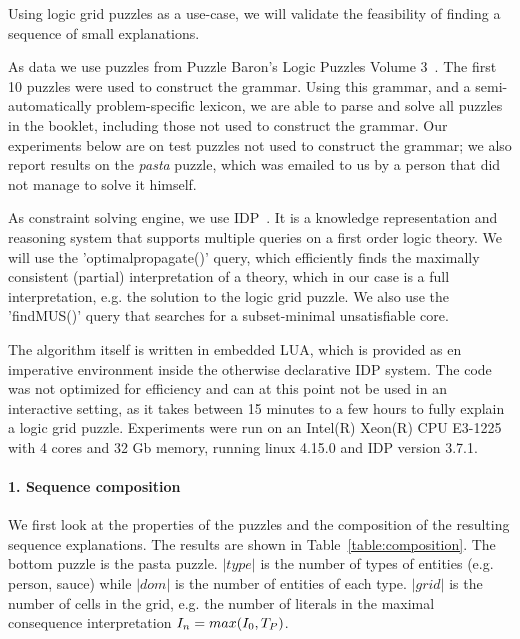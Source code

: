 Using logic grid puzzles as a use-case, we will validate the feasibility of finding a sequence of small explanations.

As data we use puzzles from Puzzle Baron’s Logic Puzzles Volume 3~\cite{logigrammen}. The first 10 puzzles were used to construct the grammar. Using this grammar, and a semi-automatically problem-specific lexicon, we are able to parse and solve all puzzles in the booklet, including those not used to construct the grammar. Our experiments below are on test puzzles not used to construct the grammar; we also report results on the \textit{pasta} puzzle, which was emailed to us by a person that did not manage to solve it himself.

As constraint solving engine, we use IDP~\cite{IDP}. It is a knowledge representation and reasoning system that supports multiple queries on a first order logic theory. We will use the 'optimalpropagate()' query, which efficiently finds the maximally consistent (partial) interpretation of a theory, which in our case is a full interpretation, e.g. the solution to the logic grid puzzle. We also use the 'findMUS()' query that searches for a subset-minimal unsatisfiable core.

The algorithm itself is written in embedded LUA, which is provided as en imperative environment inside the otherwise declarative IDP system. The code was not optimized for efficiency and can at this point not be used in an interactive setting, as it takes between 15 minutes to a few hours to fully explain a logic grid puzzle. Experiments were run on an Intel(R) Xeon(R) CPU E3-1225 with 4 cores and 32 Gb memory, running linux 4.15.0 and IDP version 3.7.1.

\paragraph{1. Sequence composition}
We first look at the properties of the puzzles and the composition of the resulting sequence explanations. The results are shown in Table~\ref{table:composition}. The bottom puzzle is the pasta puzzle. $|type|$ is the number of types of entities (e.g. person, sauce) while $|dom|$ is the number of entities of each type. $|grid|$ is the number of cells in the grid, e.g. the number of literals in the maximal consequence interpretation $I_n=max(I_0,T_P)$.

